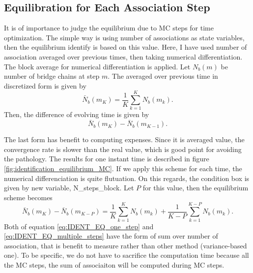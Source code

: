\documentclass[10pt, a4paper]{report}
\begin{document}
\subsection{Equilibration for Each Association Step}
It is of importance to judge the equilibrium due to MC steps for time optimization. The simple way is using number of associations as state variables, then the equilibrium identify is based on this value. Here, I have used number of association averaged over previous times, then taking numerical differentiation. The block average for numerical differentiation is applied. Let $N_b(m)$ be number of bridge chains at step $m$. The averaged over previous time in discretized form is given by
\begin{equation}
\bar{N}_b(m_K) = \frac{1}{K}\sum_{k=1}^{K}N_b(m_k).
\end{equation}
Then, the difference of evolving time is given by
\begin{equation}
\bar{N}_b(m_{K}) - \bar{N}_b(m_{K-1}).
\end{equation}

The last form has benefit to computing expenses. Since it is averaged value, the convergence rate is slower than the real value, which is good point for avoiding the pathology. The results for one instant time is described in figure \ref{fig:identification_equilibrium_MC}.
If we apply this scheme for each time, the numerical differenciation is quite flutuation. On this regards, the condition box is given by new variable, N\_steps\_block. Let $P$ for this value, then the equilibrium scheme becomes
\begin{equation}
\bar{N}_b(m_K) - \bar{N}_b(m_{K-P}) = \frac{1}{K}\sum_{k=1}^{K}N_b(m_k) + \frac{1}{K-P}\sum_{k=1}^{K-P}N_b(m_k).
\label{eq:IDENT_EQ_multiple_steps}
\end{equation}
Both of equation \eqref{eq:IDENT_EQ_one_step} and \eqref{eq:IDENT_EQ_multiple_steps} have the form of sum over number of association, that is benefit to measure rather than other method (variance-based one). To be specific, we do not have to sacrifice the computation time because all the MC steps, the sum of associaiton will be computed during MC steps.
\end{document}
